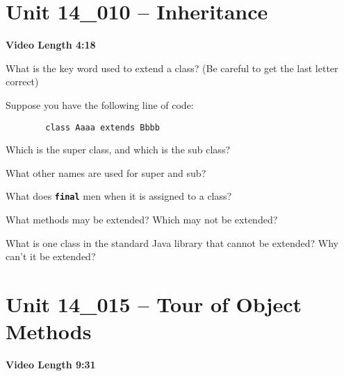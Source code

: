 \documentclass[letterpaper,12pt]{exam}
\newcommand{\unit}{Unit 14}
\begin{document}
\section*{\unit\_010 -- Inheritance} 
\par{\selectfont\textbf{Video Length 4:18 }}
\begin{questions}

\begin{samepage}
    \question What is the key word used to extend a class?  (Be careful to get the last letter correct)
    \vspace{5mm}
\end{samepage}

\begin{samepage}
    \question Suppose you have the following line of code:
    \begin{verbatim}
        class Aaaa extends Bbbb
    \end{verbatim}
        Which is the super class, and which is the sub class?
    \vspace{5mm}
\end{samepage}
\begin{samepage}
    \question What other names are used for super and sub?
    \vspace{5mm}
\end{samepage}

\begin{samepage}
    \question What does \texttt{\textbf{final}} men when it is assigned to a class?
    \vspace{5mm}
\end{samepage}

\begin{samepage}
    \question What methods may be extended?  Which may not be extended?
    \vspace{5mm}
\end{samepage}

\begin{samepage}
    \question What is one class in the standard Java library that cannot be extended?  Why can't it be extended?
    \vspace{5mm}
\end{samepage}


\section*{\unit\_015 -- Tour of Object Methods } 
\par{\selectfont\textbf{Video Length 9:31}}


\end{questions}
\end{document}
